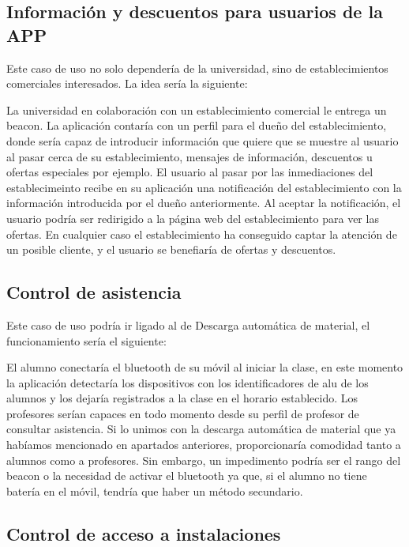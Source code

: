\subsection{Información y descuentos para usuarios de la APP}

Este caso de uso no solo dependería de la universidad, sino de establecimientos comerciales interesados. La idea sería la siguiente: 

La universidad en colaboración con un establecimiento comercial le entrega un beacon. La aplicación contaría con un perfil para el dueño del establecimiento, donde sería capaz de introducir información que quiere que se muestre al usuario al pasar cerca de su establecimiento, mensajes de información, descuentos u ofertas especiales por ejemplo. El usuario al pasar por las inmediaciones del establecimeinto recibe en su aplicación una notificación del establecimiento con la información introducida por el dueño anteriormente. Al aceptar la notificación, el usuario podría ser redirigido a la página web del establecimiento para ver las ofertas. En cualquier caso el establecimiento ha conseguido captar la atención de un posible cliente, y el usuario se benefiaría de ofertas y descuentos. 

\subsection{Control de asistencia}

Este caso de uso podría ir ligado al de Descarga automática de material, el funcionamiento sería el siguiente: 

El alumno conectaría el bluetooth de su móvil al iniciar la clase, en este momento la aplicación detectaría los dispositivos con los identificadores de alu de los alumnos y los dejaría registrados a la clase en el horario establecido. Los profesores serían capaces en todo momento desde su perfil de profesor de consultar asistencia. Si lo unimos con la descarga automática de material que ya habíamos mencionado en apartados anteriores, proporcionaría comodidad tanto a alumnos como a profesores. Sin embargo, un impedimento podría ser el rango del beacon o la necesidad de activar el bluetooth ya que, si el alumno no tiene batería en el móvil, tendría que haber un método secundario. 

\subsection{Control de acceso a instalaciones}


